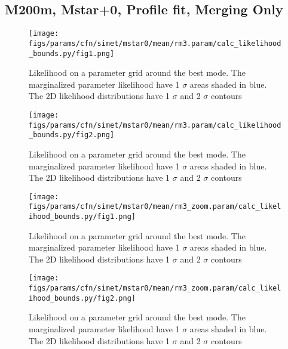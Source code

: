 \documentclass[twocolumn]{article}
\begin{document}
\subsection{M200m, Mstar+0, Profile fit, Merging Only}
\begin{figure}[H]
  \center\texttt{[image: figs/params/cfn/simet/mstar0/mean/rm3.param/calc\_likelihood\_bounds.py/fig1.png]}
  \caption{Likelihood on a parameter grid around the best mode. The marginalized parameter likelihood have
    1 $\sigma$ areas shaded in blue. The 2D likelihood distributions have 1 $\sigma$  and 2 $\sigma$ contours}
  \label{fig:basic_rd:likelihood}
\end{figure}

\begin{figure}[H]
  \center\texttt{[image: figs/params/cfn/simet/mstar0/mean/rm3.param/calc\_likelihood\_bounds.py/fig2.png]}
  \caption{Likelihood on a parameter grid around the best mode. The marginalized parameter likelihood have
    1 $\sigma$ areas shaded in blue. The 2D likelihood distributions have 1 $\sigma$  and 2 $\sigma$ contours}
  \label{fig:basic_rd:likelihood}
\end{figure}

\begin{figure}[H]
  \center\texttt{[image: figs/params/cfn/simet/mstar0/mean/rm3\_zoom.param/calc\_likelihood\_bounds.py/fig1.png]}
  \caption{Likelihood on a parameter grid around the best mode. The marginalized parameter likelihood have
    1 $\sigma$ areas shaded in blue. The 2D likelihood distributions have 1 $\sigma$  and 2 $\sigma$ contours}
  \label{fig:basic_rd:likelihood}
\end{figure}

\begin{figure}[H]
  \center\texttt{[image: figs/params/cfn/simet/mstar0/mean/rm3\_zoom.param/calc\_likelihood\_bounds.py/fig2.png]}
  \caption{Likelihood on a parameter grid around the best mode. The marginalized parameter likelihood have
    1 $\sigma$ areas shaded in blue. The 2D likelihood distributions have 1 $\sigma$  and 2 $\sigma$ contours}
  \label{fig:basic_rd:likelihood}
\end{figure}
\end{document}
